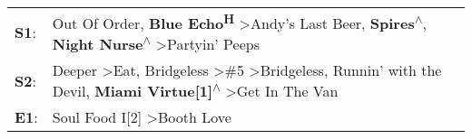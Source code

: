 \begin{supertabular}{p{0.03\textwidth}p{0.92\textwidth}}
 \textbf{S1}:  &                                                                        Out Of Order\textsuperscript{}, \enspace \textbf{Blue Echo\textsuperscript{H}} \textgreater \enspace Andy's Last Beer\textsuperscript{}, \enspace \textbf{Spires\textsuperscript{$\wedge$}}, \enspace \textbf{Night Nurse\textsuperscript{$\wedge$}} \textgreater \enspace Partyin' Peeps\textsuperscript{}  \enspace  \\
 \textbf{S2}:  &  Deeper\textsuperscript{} \textgreater \enspace Eat\textsuperscript{}, \enspace Bridgeless\textsuperscript{} \textgreater \enspace \#5\textsuperscript{} \textgreater \enspace Bridgeless\textsuperscript{}, \enspace Runnin' with the Devil\textsuperscript{}, \enspace \textbf{Miami Virtue[1]\textsuperscript{$\wedge$}} \textgreater \enspace Get In The Van\textsuperscript{}  \enspace  \\
 \textbf{E1}:  &                                                                                                                                                                                                                                                                                                Soul Food I[2]\textsuperscript{} \textgreater \enspace Booth Love\textsuperscript{}  \enspace  \\
\end{supertabular}
